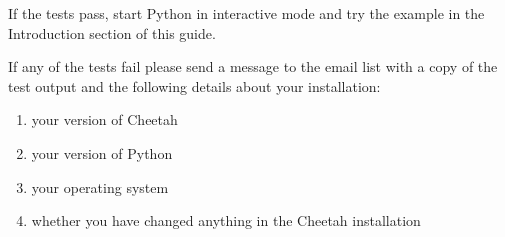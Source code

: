 If the tests pass, start Python in interactive mode and try the example in the
Introduction section of this guide.

If any of the tests fail please send a message to the email list with a copy of
the test output and the following details about your installation:

\begin{enumerate}
\item your version of Cheetah
\item your version of Python
\item your operating system
\item whether you have changed anything in the Cheetah installation
\end{enumerate}

